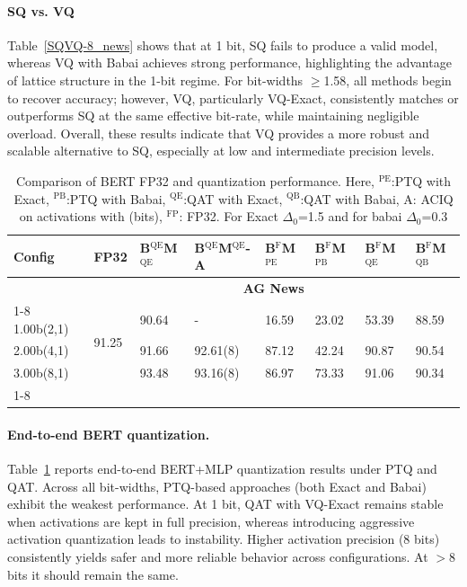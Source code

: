 \documentclass{article}
\theoremstyle{definition}
\theoremstyle{remark}
\begin{document}
\paragraph{SQ vs. VQ}
Table~\ref{SQVQ-8_news} shows that at 1 bit, SQ fails to produce a valid model, whereas VQ with Babai achieves strong performance, highlighting the advantage of lattice structure in the 1-bit regime.
For bit-widths $\ge$1.58, all methods begin to recover accuracy; however, VQ, particularly VQ-Exact, consistently matches or outperforms SQ at the same effective bit-rate, while maintaining negligible overload.
Overall, these results indicate that VQ provides a more robust and scalable alternative to SQ, especially at low and intermediate precision levels.
\begin{table}[h]
    \centering
    \scriptsize
    \caption{Comparison of BERT FP32 and quantization performance. Here, $^{\text{PE}}$:PTQ with Exact, $^{\text{PB}}$:PTQ with Babai,  $^{\text{QE}}$:QAT with Exact, $^{\text{QB}}$:QAT with Babai, A: ACIQ on activations with (bits), $^{\text{FP}}$: FP32. For Exact $\Delta_0$=1.5 and for babai $\Delta_0$=0.3}
    \label{bert_results_f_news}
   
    \begin{tabular}{| p{1cm}|p{0.4cm}|p{0.8cm}|p{1.4cm}|p{0.7cm}|p{0.7cm}|p{0.7cm}|p{0.7cm}|} \hline
\textbf{Config}	&  \textbf{FP32}	& \textbf{B$^{\text{QE}}$M$^{\text{QE}}$} & \textbf{B$^{\text{QE}}$M$^{\text{QE}}$-A}  & \textbf{B$^{\text{F}}$M$^{\text{PE}}$}	&	\textbf{B$^{\text{F}}$M$^{\text{PB}}$}	&	\textbf{B$^{\text{F}}$M$^{\text{QE}}$}	&	\textbf{B$^{\text{F}}$M$^{\text{QB}}$}  \\  \hline
\rowcolor{black!20}
& \multicolumn{7}{c|}{\textbf{AG News}} \\ \cline{1-8}
1.00b(2,1) 	&   \multirow{3}{*}{91.25}   &    90.64  & - & 16.59 & 23.02 & 53.39 & 88.59  \\
2.00b(4,1)		&      & 91.66   & 92.61(8) & 87.12 & 42.24 & 90.87 & 90.54\\
3.00b(8,1)		&       & 93.48  & 93.16(8) & 86.97 & 73.33 & 91.06 & 90.34    \\
\cline{1-8}
\end{tabular}
\end{table}
\paragraph{End-to-end BERT quantization.}
Table~\ref{bert_results_f_news} reports end-to-end BERT+MLP quantization results under PTQ and QAT.
Across all bit-widths, PTQ-based approaches (both Exact and Babai) exhibit the weakest performance.
At 1 bit, QAT with VQ-Exact remains stable when activations are kept in full precision, whereas introducing aggressive activation quantization leads to instability.
Higher activation precision (8 bits) consistently yields safer and more reliable behavior across configurations. At $>8$ bits it should remain the same. 
\end{document}
